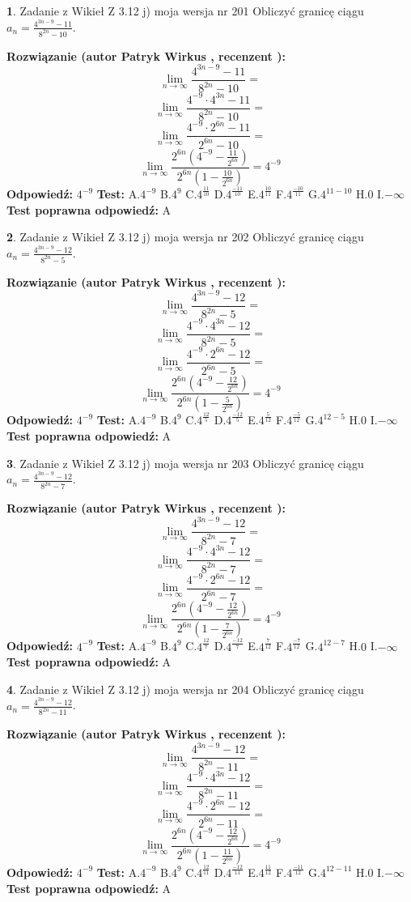 \documentclass[12pt, a4paper]{article}
\theoremstyle{definition} %
\newtheorem{zad}{}
\newcommand{\zadStart}[1]{\begin{zad}#1\newline}
\newcommand{\zadStop}{\end{zad}}
\newcommand{\rozwStart}[2]{\noindent \textbf{Rozwiązanie (autor #1 , recenzent #2): }\newline}
\newcommand{\rozwStop}{\newline}
\newcommand{\odpStart}{\noindent \textbf{Odpowiedź:}\newline}
\newcommand{\odpStop}{\newline}
\newcommand{\testStart}{\noindent \textbf{Test:}\newline}
\newcommand{\testStop}{\newline}
\newcommand{\kluczStart}{\noindent \textbf{Test poprawna odpowiedź:}\newline}
\newcommand{\kluczStop}{\newline}
\begin{document}
\zadStart{Zadanie z Wikieł Z 3.12 j) moja wersja nr 201}
Obliczyć granicę ciągu $a_{n}=\frac{4^{3n-9}-11}{8^{2n}-10}$.
\zadStop
\rozwStart{Patryk Wirkus}{}
$$\lim\limits_{n\to\infty}\frac{4^{3n-9}-11}{8^{2n}-10}=$$
$$\lim\limits_{n\to\infty}\frac{4^{-9} \cdot 4^{3n}-11}{8^{2n}-10}=$$
$$\lim\limits_{n\to\infty}\frac{4^{-9} \cdot 2^{6n}-11}{2^{6n}-10}=$$
$$\lim\limits_{n\to\infty}\frac{2^{6n}(4^{-9} - \frac{11}{2^{6n}})}{2^{6n}(1-\frac{10}{2^{6n}})}= 4^{-9}$$
\rozwStop
\odpStart
$4^{-9}$
\odpStop
\testStart
A.$4^{-9}$
B.$4^{9}$
C.$4^{\frac{11}{10}}$
D.$4^{\frac{-11}{10}}$
E.$4^{\frac{10}{11}}$
F.$4^{\frac{-10}{11}}$
G.$4^{11-10}$
H.$0$
I.$-\infty$
\testStop
\kluczStart
A
\kluczStop



\zadStart{Zadanie z Wikieł Z 3.12 j) moja wersja nr 202}
Obliczyć granicę ciągu $a_{n}=\frac{4^{3n-9}-12}{8^{2n}-5}$.
\zadStop
\rozwStart{Patryk Wirkus}{}
$$\lim\limits_{n\to\infty}\frac{4^{3n-9}-12}{8^{2n}-5}=$$
$$\lim\limits_{n\to\infty}\frac{4^{-9} \cdot 4^{3n}-12}{8^{2n}-5}=$$
$$\lim\limits_{n\to\infty}\frac{4^{-9} \cdot 2^{6n}-12}{2^{6n}-5}=$$
$$\lim\limits_{n\to\infty}\frac{2^{6n}(4^{-9} - \frac{12}{2^{6n}})}{2^{6n}(1-\frac{5}{2^{6n}})}= 4^{-9}$$
\rozwStop
\odpStart
$4^{-9}$
\odpStop
\testStart
A.$4^{-9}$
B.$4^{9}$
C.$4^{\frac{12}{5}}$
D.$4^{\frac{-12}{5}}$
E.$4^{\frac{5}{12}}$
F.$4^{\frac{-5}{12}}$
G.$4^{12-5}$
H.$0$
I.$-\infty$
\testStop
\kluczStart
A
\kluczStop



\zadStart{Zadanie z Wikieł Z 3.12 j) moja wersja nr 203}
Obliczyć granicę ciągu $a_{n}=\frac{4^{3n-9}-12}{8^{2n}-7}$.
\zadStop
\rozwStart{Patryk Wirkus}{}
$$\lim\limits_{n\to\infty}\frac{4^{3n-9}-12}{8^{2n}-7}=$$
$$\lim\limits_{n\to\infty}\frac{4^{-9} \cdot 4^{3n}-12}{8^{2n}-7}=$$
$$\lim\limits_{n\to\infty}\frac{4^{-9} \cdot 2^{6n}-12}{2^{6n}-7}=$$
$$\lim\limits_{n\to\infty}\frac{2^{6n}(4^{-9} - \frac{12}{2^{6n}})}{2^{6n}(1-\frac{7}{2^{6n}})}= 4^{-9}$$
\rozwStop
\odpStart
$4^{-9}$
\odpStop
\testStart
A.$4^{-9}$
B.$4^{9}$
C.$4^{\frac{12}{7}}$
D.$4^{\frac{-12}{7}}$
E.$4^{\frac{7}{12}}$
F.$4^{\frac{-7}{12}}$
G.$4^{12-7}$
H.$0$
I.$-\infty$
\testStop
\kluczStart
A
\kluczStop



\zadStart{Zadanie z Wikieł Z 3.12 j) moja wersja nr 204}
Obliczyć granicę ciągu $a_{n}=\frac{4^{3n-9}-12}{8^{2n}-11}$.
\zadStop
\rozwStart{Patryk Wirkus}{}
$$\lim\limits_{n\to\infty}\frac{4^{3n-9}-12}{8^{2n}-11}=$$
$$\lim\limits_{n\to\infty}\frac{4^{-9} \cdot 4^{3n}-12}{8^{2n}-11}=$$
$$\lim\limits_{n\to\infty}\frac{4^{-9} \cdot 2^{6n}-12}{2^{6n}-11}=$$
$$\lim\limits_{n\to\infty}\frac{2^{6n}(4^{-9} - \frac{12}{2^{6n}})}{2^{6n}(1-\frac{11}{2^{6n}})}= 4^{-9}$$
\rozwStop
\odpStart
$4^{-9}$
\odpStop
\testStart
A.$4^{-9}$
B.$4^{9}$
C.$4^{\frac{12}{11}}$
D.$4^{\frac{-12}{11}}$
E.$4^{\frac{11}{12}}$
F.$4^{\frac{-11}{12}}$
G.$4^{12-11}$
H.$0$
I.$-\infty$
\testStop
\kluczStart
A
\kluczStop
\end{document}
